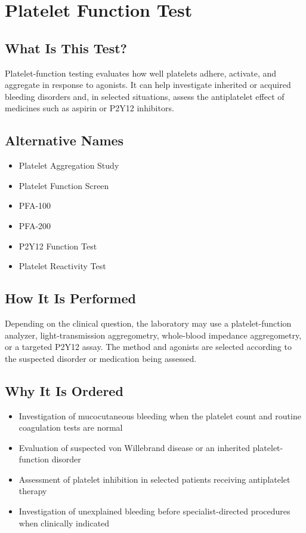 \chapter{Platelet Function Test}

\section*{What Is This Test?}
Platelet-function testing evaluates how well platelets adhere, activate, and aggregate in response to agonists. It can help investigate inherited or acquired bleeding disorders and, in selected situations, assess the antiplatelet effect of medicines such as aspirin or P2Y12 inhibitors.

\section*{Alternative Names}
\begin{itemize}
  \item Platelet Aggregation Study
  \item Platelet Function Screen
  \item PFA-100
  \item PFA-200
  \item P2Y12 Function Test
  \item Platelet Reactivity Test
\end{itemize}
\section*{How It Is Performed}
Depending on the clinical question, the laboratory may use a platelet-function analyzer, light-transmission aggregometry, whole-blood impedance aggregometry, or a targeted P2Y12 assay. The method and agonists are selected according to the suspected disorder or medication being assessed.

\section*{Why It Is Ordered}
\begin{itemize}
  \item Investigation of mucocutaneous bleeding when the platelet count and routine coagulation tests are normal
  \item Evaluation of suspected von Willebrand disease or an inherited platelet-function disorder
  \item Assessment of platelet inhibition in selected patients receiving antiplatelet therapy
  \item Investigation of unexplained bleeding before specialist-directed procedures when clinically indicated
\end{itemize}

